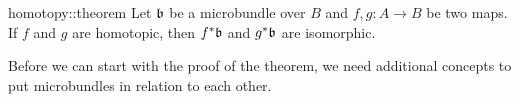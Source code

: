 \begin{mytheorem}{homotopy::theorem}%
    Let $\mathfrak{b}$ be a microbundle over $B$ and $f, g: A \to B$ be two maps.
    If $f$ and $g$ are homotopic, then $f^*\mathfrak{b}$ and $g^*\mathfrak{b}$ are isomorphic.
\end{mytheorem}

\begin{myparagraph}
    Before we can start with the proof of the theorem,
    we need additional concepts to put microbundles in relation to each other.
\end{myparagraph}
